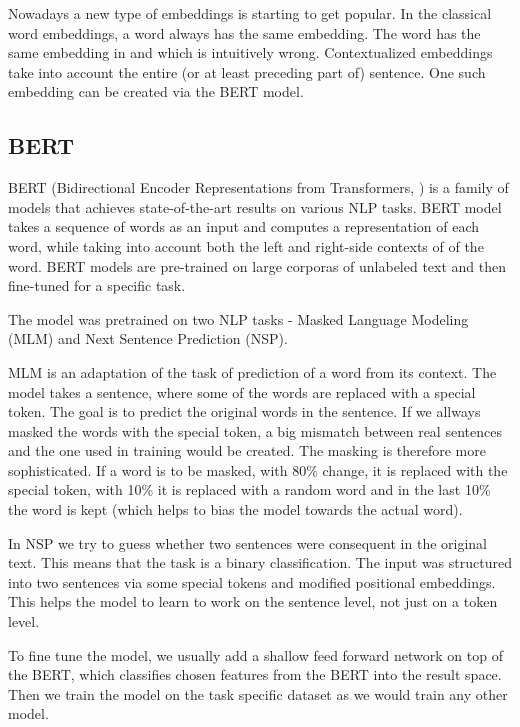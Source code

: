 Nowadays a new type of embeddings is starting to get popular. In the classical word embeddings, a word always has the same embedding. The word  has the same embedding in  and  which is intuitively wrong. Contextualized embeddings take into account the entire (or at least preceding part of) sentence. One such embedding can be created via the BERT model.

\subsection{BERT}
BERT (Bidirectional Encoder Representations from Transformers, \cite{bert}) is a family of models that achieves state-of-the-art results on various NLP tasks. BERT model takes a sequence of words as an input and computes a representation of each word, while taking into account both the left and right-side contexts of of the word. BERT models are pre-trained on large corporas of unlabeled text and then fine-tuned for a specific task. 

The model was pretrained on two NLP tasks - Masked Language Modeling (MLM) and Next Sentence Prediction (NSP). 

MLM is an adaptation of the task of prediction of a word from its context. The model takes a sentence, where some of the words are replaced with a special token. The goal is to predict the original words in the sentence. If we allways masked the words with the special token, a big mismatch between real sentences and the one used in training would be created. The masking is therefore more sophisticated. If a word is to be masked, with 80\% change, it is replaced with the special token, with 10\% it is replaced with a random word and in the last 10\% the word is kept (which helps to bias the model towards the actual word).

In NSP we try to guess whether two sentences were consequent in the original text. This means that the task is a binary classification. The input was structured into two sentences via some special tokens and modified positional embeddings. This helps the model to learn to work on the sentence level, not just on a token level.

To fine tune the model, we usually add a shallow feed forward network on top of the BERT, which classifies chosen features from the BERT into the result space. Then we train the model on the task specific dataset as we would train any other model.


